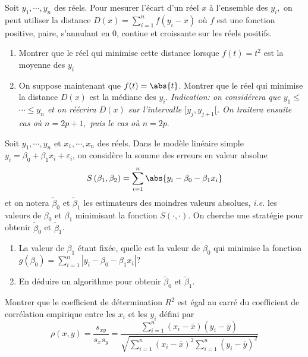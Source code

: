 \documentclass{td_um}
\providecommand{\1}{\mathds{1}}
\begin{document}
\cor{\newpage}

\exo{} 
Soit $y_{1}, \cdots, y_{n}$ des réels. Pour mesurer l'écart d'un réel $x$ à l'ensemble des $y_{i},$ on peut utiliser la distance $D(x)=\sum_{i=1}^{n} f\left(y_{i}-x\right)$ où $f$ est une fonction positive, paire, s'annulant en 0, contiue et croissante sur les réels positifs.
\begin{enumerate}
    \item Montrer que le réel qui minimise cette distance lorsque $f(t)=t^{2}$ est la moyenne des $y_{i}$
    \item On suppose maintenant que $f(t)=\abs{t}$. Montrer que le réel qui minimise la distance $D(x)$ est la médiane des $y_{i}$. {\it Indication: on considérera que $y_{1} \leq$ $\cdots \leq y_{n}$ et on réécrira $D(x)$ sur l'intervalle $[y_{j}, y_{j+1}[$. On traitera ensuite cas où $n=2 p+1,$ puis le cas où $n=2 p$}.

\end{enumerate}

\cor{\newpage}

\exo{} Soit $y_{1}, \cdots, y_{n}$ et $x_{1}, \cdots, x_{n}$ des réels. Dans le modèle linéaire simple $y_{i}=\beta_{0}+\beta_{1} x_{i}+\varepsilon_{i}$, on considère la somme des erreurs en valeur absolue
\[
    S\left(\beta_{1}, \beta_{2}\right)=\sum_{i=1}^{n}\abs{y_{i}-\beta_{0}-\beta_{1} x_{i}}
\]
et on notera $\tilde{\beta}_{0}$ et $\tilde{\beta}_{1}$ les estimateurs des moindres valeurs absolues, \textit{i.e.} les valeurs de $\beta_{0}$ et $\beta_{1}$ minimisant la fonction $S(\cdot, \cdot)$. On cherche une stratégie pour obtenir $\tilde{\beta}_{0}$ et $\tilde{\beta}_{1}$.
\begin{enumerate}
 \item La valeur de $\beta_{1}$ étant fixée, quelle est la valeur de $\beta_{0}$ qui minimise la fonction $g\left(\beta_{0}\right)=\sum_{i=1}^{n}\left|y_{i}-\beta_{0}-\beta_{1} x_{i}\right| ?$
 \item En déduire un algorithme pour obtenir $\tilde{\beta}_{0}$ et $\tilde{\beta}_{1}$.
\end{enumerate}


\cor{\newpage}

\exo{}
Montrer que le coefficient de détermination $R^{2}$ est égal au carré du coefficient de corrélation empirique entre les $x_{i}$ et les $y_{i}$ défini par
\[
\rho(x, y)=\frac{s_{x y}}{s_{x} s_{y}}=\frac{\sum_{i=1}^{n}\left(x_{i}-\bar{x}\right)\left(y_{i}-\bar{y}\right)}{\sqrt{\sum_{i=1}^{n}\left(x_{i}-\bar{x}\right)^{2} \sum_{i=1}^{n}\left(y_{i}-\bar{y}\right)^{2}}}
\]
\end{document}
